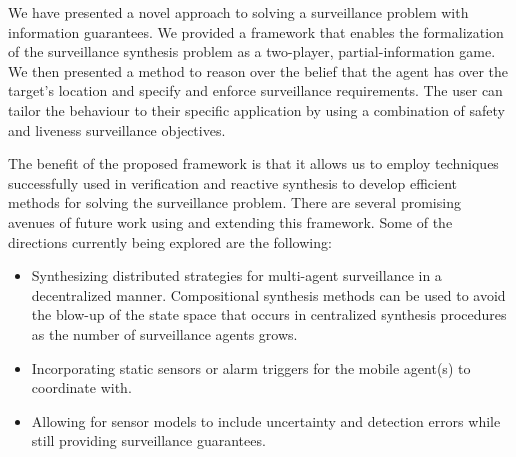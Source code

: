 We have presented a novel approach to solving a surveillance problem with information guarantees. We provided a framework that enables the  formalization of the surveillance synthesis problem as a two-player, partial-information game. We then presented a method to reason over the belief that the agent has over the target's location and specify and enforce surveillance requirements. The user can tailor the behaviour to their specific application by using a combination of safety and liveness surveillance objectives.

The benefit of the proposed framework is that it allows us to employ techniques successfully used in verification and reactive synthesis to develop efficient methods for solving the surveillance problem. There are several promising  avenues of future work using and extending this framework. Some of the directions currently being explored are the following:
\begin{itemize}
\item Synthesizing distributed strategies for multi-agent surveillance in a decentralized manner. Compositional synthesis methods can be used to avoid  the blow-up of the state space that occurs in centralized synthesis procedures as the number of surveillance agents grows.
\item Incorporating static sensors or alarm triggers for the mobile agent(s) to coordinate with.
\item Allowing for sensor models to include uncertainty and detection errors while still providing surveillance guarantees.

\end{itemize}